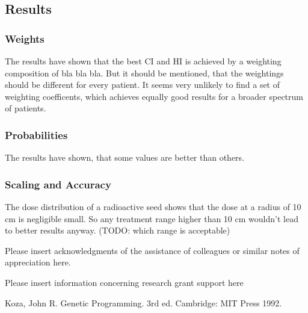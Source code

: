 \documentclass[USenglish,twocolumn]{article}
\begin{document}
\subsection{Results}


\subsubsection{Weights}
The results have shown that the best CI and HI is achieved by a weighting composition of bla bla bla. But it should be mentioned, that the weightings should be different for every patient. It seems very unlikely to find a set of weighting coefficents, which achieves equally good results for a broader spectrum of patients.

\subsubsection{Probabilities} 
The results have shown, that some values are better than others.

\subsubsection{Scaling and Accuracy}
The dose distribution of a radioactive seed shows that the dose at a radius of 10 cm is negligible small. So any treatment range higher than 10 cm wouldn't lead to better results anyway. (TODO: which range is acceptable)
\begin{acknowledgement}
Please insert acknowledgments of the assistance of colleagues or similar notes of appreciation here.
\end{acknowledgement}

\def\acknowledgementname{Funding}
\begin{acknowledgement}
Please insert information concerning research grant support here
\end{acknowledgement}

%
%

\begin{thebibliography}{9}



Koza, John R. Genetic Programming. 3rd ed. Cambridge: MIT Press 1992.

\end{thebibliography}
\end{document}
